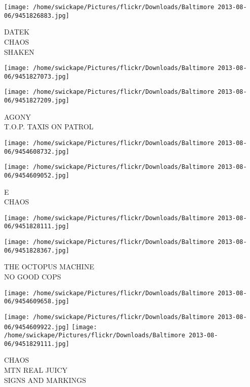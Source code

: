 \documentclass[10pt,letterpaper]{article}
\begin{document}
\texttt{[image: /home/swickape/Pictures/flickr/Downloads/Baltimore 2013-08-06/9451826883.jpg]}

DATEK\\
CHAOS\\
SHAKEN\\
\pagebreak

\texttt{[image: /home/swickape/Pictures/flickr/Downloads/Baltimore 2013-08-06/9451827073.jpg]}

\vspace{0.25in}
\texttt{[image: /home/swickape/Pictures/flickr/Downloads/Baltimore 2013-08-06/9451827209.jpg]}

AGONY\\
T.O.P. TAXIS ON PATROL\\
\pagebreak

\texttt{[image: /home/swickape/Pictures/flickr/Downloads/Baltimore 2013-08-06/9454608732.jpg]}

\vspace{0.25in}
\texttt{[image: /home/swickape/Pictures/flickr/Downloads/Baltimore 2013-08-06/9454609052.jpg]}

E\\
CHAOS\\
\pagebreak

\texttt{[image: /home/swickape/Pictures/flickr/Downloads/Baltimore 2013-08-06/9451828111.jpg]}

\vspace{0.25in}
\texttt{[image: /home/swickape/Pictures/flickr/Downloads/Baltimore 2013-08-06/9451828367.jpg]}

THE OCTOPUS MACHINE\\
NO GOOD COPS\\
\pagebreak

\texttt{[image: /home/swickape/Pictures/flickr/Downloads/Baltimore 2013-08-06/9454609658.jpg]}

\vspace{0.25in}
\texttt{[image: /home/swickape/Pictures/flickr/Downloads/Baltimore 2013-08-06/9454609922.jpg]}
\texttt{[image: /home/swickape/Pictures/flickr/Downloads/Baltimore 2013-08-06/9451829111.jpg]}

CHAOS\\
MTN REAL JUICY\\
SIGNS AND MARKINGS\\
\pagebreak
\end{document}
